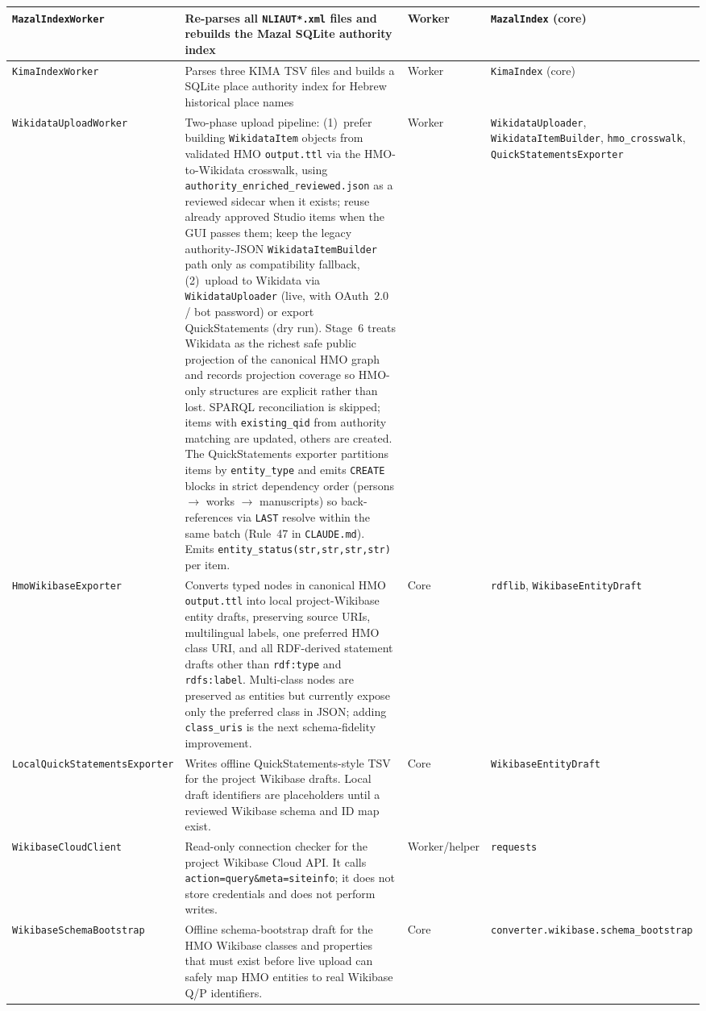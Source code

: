 \documentclass[12pt]{article}
\newcommand{\filepath}[1]{\texttt{\small #1}}
\newcommand{\code}[1]{\texttt{#1}}
\begin{document}
\begin{longtable}{|l|p{4.5cm}|l|p{3cm}|}
\hline
\code{MazalIndexWorker} & Re-parses all \code{NLIAUT*.xml} files and rebuilds the Mazal SQLite authority index & Worker & \code{MazalIndex} (core) \\
\hline
\code{KimaIndexWorker} & Parses three KIMA TSV files and builds a SQLite place authority index for Hebrew historical place names & Worker & \code{KimaIndex} (core) \\
\hline
\code{WikidataUploadWorker} & Two-phase upload pipeline: (1)~prefer building \code{WikidataItem} objects from validated HMO \code{output.ttl} via the HMO-to-Wikidata crosswalk, using \code{authority\_enriched\_reviewed.json} as a reviewed sidecar when it exists; reuse already approved Studio items when the GUI passes them; keep the legacy authority-JSON \code{WikidataItemBuilder} path only as compatibility fallback, (2)~upload to Wikidata via \code{WikidataUploader} (live, with OAuth~2.0 / bot password) or export QuickStatements (dry run). Stage~6 treats Wikidata as the richest safe public projection of the canonical HMO graph and records projection coverage so HMO-only structures are explicit rather than lost. SPARQL reconciliation is skipped; items with \code{existing\_qid} from authority matching are updated, others are created. The QuickStatements exporter partitions items by \code{entity\_type} and emits \code{CREATE} blocks in strict dependency order (persons $\to$ works $\to$ manuscripts) so back-references via \code{LAST} resolve within the same batch (Rule~47 in \filepath{CLAUDE.md}). Emits \code{entity\_status(str,str,str,str)} per item. & Worker & \code{WikidataUploader}, \code{WikidataItemBuilder}, \code{hmo\_crosswalk}, \code{QuickStatementsExporter} \\
\hline
\code{HmoWikibaseExporter} & Converts typed nodes in canonical HMO \code{output.ttl} into local project-Wikibase entity drafts, preserving source URIs, multilingual labels, one preferred HMO class URI, and all RDF-derived statement drafts other than \code{rdf:type} and \code{rdfs:label}. Multi-class nodes are preserved as entities but currently expose only the preferred class in JSON; adding \code{class\_uris} is the next schema-fidelity improvement. & Core & \code{rdflib}, \code{WikibaseEntityDraft} \\
\hline
\code{LocalQuickStatementsExporter} & Writes offline QuickStatements-style TSV for the project Wikibase drafts. Local draft identifiers are placeholders until a reviewed Wikibase schema and ID map exist. & Core & \code{WikibaseEntityDraft} \\
\hline
\code{WikibaseCloudClient} & Read-only connection checker for the project Wikibase Cloud API. It calls \code{action=query\&meta=siteinfo}; it does not store credentials and does not perform writes. & Worker/helper & \code{requests} \\
\hline
\code{WikibaseSchemaBootstrap} & Offline schema-bootstrap draft for the HMO Wikibase classes and properties that must exist before live upload can safely map HMO entities to real Wikibase Q/P identifiers. & Core & \code{converter.wikibase.schema\_bootstrap} \\
\hline
\end{longtable}
\end{document}
